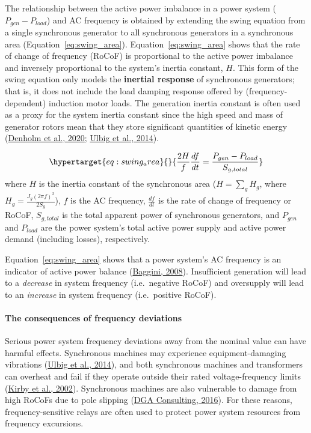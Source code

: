 \documentclass[12pt,a4paper,]{report}
\begin{document}
The relationship between the active power imbalance in a power system
(\(P_{gen}-P_{load}\)) and AC frequency is obtained by extending the
swing equation from a single synchronous generator to all synchronous
generators in a synchronous area (Equation~\ref{eq:swing_area}).
Equation~\ref{eq:swing_area} shows that the rate of change of frequency
(RoCoF) is proportional to the active power imbalance and inversely
proportional to the system's inertia constant, \(H\). This form of the
swing equation only models the \textbf{inertial response} of synchronous
generators; that is, it does not include the load damping response
offered by (frequency-dependent) induction motor loads. The generation
inertia constant is often used as a proxy for the system inertia
constant since the high speed and mass of generator rotors mean that
they store significant quantities of kinetic energy
(\protect\hyperlink{ref-denholmInertiaPowerGrid2020}{Denholm et al.,
2020}; \protect\hyperlink{ref-ulbigImpactLowRotational2014}{Ulbig et
al., 2014}).

\begin{equation}\protect\hypertarget{eq:swing_area}{}{\frac{2H}{f}\frac{df}{dt} = \frac{P_{gen}-P_{load}}{S_{g, total}}}\label{eq:swing_area}\end{equation}
where \(H\) is the inertia constant of the synchronous area
(\(H=\sum_{g} H_g\), where \(H_g = \frac{J_g(2\pi f)^2}{2S_g}\)), \(f\)
is the AC frequency, \(\frac{df}{dt}\) is the rate of change of
frequency or RoCoF, \(S_{g,total}\) is the total apparent power of
synchronous generators, and \(P_{gen}\) and \(P_{load}\) are the power
system's total active power supply and active power demand (including
losses), respectively.

Equation~\ref{eq:swing_area} shows that a power system's AC frequency is
an indicator of active power balance
(\protect\hyperlink{ref-bagginiHandbookPowerQuality2008}{Baggini,
2008}). Insufficient generation will lead to a \emph{decrease} in system
frequency (i.e.~negative RoCoF) and oversupply will lead to an
\emph{increase} in system frequency (i.e.~positive RoCoF).

\hypertarget{sec:lit_review-balancing_need-consequences}{%
\paragraph{The consequences of frequency
deviations}\label{sec:lit_review-balancing_need-consequences}}

Serious power system frequency deviations away from the nominal value
can have harmful effects. Synchronous machines may experience
equipment-damaging vibrations
(\protect\hyperlink{ref-ulbigImpactLowRotational2014}{Ulbig et al.,
2014}), and both synchronous machines and transformers can overheat and
fail if they operate outside their rated voltage-frequency limits
(\protect\hyperlink{ref-kirbyFrequencyControlConcerns2002}{Kirby et al.,
2002}). Synchronous machines are also vulnerable to damage from high
RoCoFs due to pole slipping
(\protect\hyperlink{ref-dgaconsultingInternationalReviewFrequency2016}{DGA
Consulting, 2016}). For these reasons, frequency-sensitive relays are
often used to protect power system resources from frequency excursions.
\end{document}
